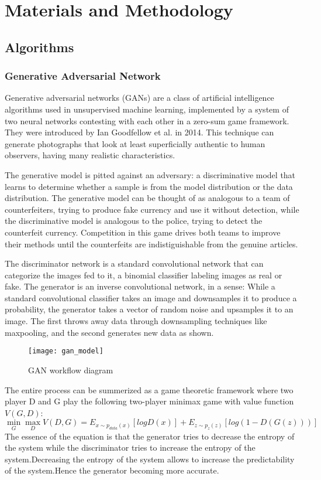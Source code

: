 
\chapter{Materials and Methodology}
\section{Algorithms}
\subsection{Generative Adversarial Network}
Generative adversarial networks (GANs) are a class of artificial intelligence algorithms used in unsupervised machine learning, implemented by a system of two neural networks contesting with each other in a zero-sum game framework. They were introduced by Ian Goodfellow et al. in 2014. This technique can generate photographs that look at least superficially authentic to human observers, having many realistic characteristics.

The generative model is pitted against an adversary: a
discriminative model that learns to determine whether a sample is from the model distribution or the
data distribution. The generative model can be thought of as analogous to a team of counterfeiters,
trying to produce fake currency and use it without detection, while the discriminative model is
analogous to the police, trying to detect the counterfeit currency. Competition in this game drives
both teams to improve their methods until the counterfeits are indistiguishable from the genuine
articles.

The discriminator network is a standard convolutional network that can categorize the images fed to it, a binomial classifier labeling images as real or fake. The generator is an inverse convolutional network, in a sense: While a standard convolutional classifier takes an image and downsamples it to produce a probability, the generator takes a vector of random noise and upsamples it to an image. The first throws away data through downsampling techniques like maxpooling, and the second generates new data as shown.


\begin{figure}
 \centering
 \texttt{[image: gan\_model]}
 \caption{GAN workflow diagram}
 \label{fig:ganmodel}
\end{figure}

The entire process can be summerized as a game theoretic framework where two player D and G play the following two-player minimax game with value function $V(G,D)$:
\begin{equation}
\min_{G}\max_{D}V(D,G) = E_{x\sim p_{data}(x)}[log D(x)] + E_{z\sim p_z(z)}[log( 1 - D(G(z)))] 
\end{equation}
The essence of the equation is that the generator tries to decrease the entropy of the system while the discriminator  tries to increase the entropy of the system.Decreasing the entropy of the system allows to increase the predictability of the system.Hence the generator becoming more accurate.

